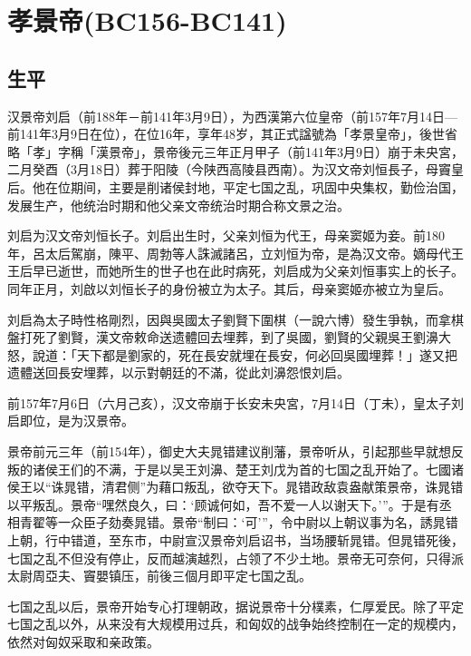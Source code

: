 
\section{孝景帝\tiny(BC156-BC141)}

\subsection{生平}

汉景帝刘启（前188年－前141年3月9日），为西漢第六位皇帝（前157年7月14日—前141年3月9日在位），在位16年，享年48岁，其正式諡號為「孝景皇帝」，後世省略「孝」字稱「漢景帝」，景帝後元三年正月甲子（前141年3月9日）崩于未央宮，二月癸酉（3月18日）葬于阳陵（今陕西高陵县西南）。为汉文帝刘恒長子，母竇皇后。他在位期间，主要是削诸侯封地，平定七国之乱，巩固中央集权，勤俭治国，发展生产，他统治时期和他父亲文帝统治时期合称文景之治。

刘启为汉文帝刘恒长子。刘启出生时，父亲刘恒为代王，母亲窦姬为妾。前180年，呂太后駕崩，陳平、周勃等人誅滅諸呂，立刘恒为帝，是為汉文帝。嫡母代王王后早已逝世，而她所生的世子也在此时病死，刘启成为父亲刘恒事实上的长子。同年正月，刘啟以刘恒长子的身份被立为太子。其后，母亲窦姬亦被立为皇后。

刘启為太子時性格剛烈，因與吳國太子劉賢下圍棋（一說六博）發生爭執，而拿棋盤打死了劉賢，漢文帝敕命送遗體回去埋葬，到了吳國，劉賢的父親吳王劉濞大怒，說道：「天下都是劉家的，死在長安就埋在長安，何必回吳國埋葬！」遂又把遗體送回長安埋葬，以示對朝廷的不滿，從此刘濞怨恨刘启。

前157年7月6日（六月己亥），汉文帝崩于长安未央宮，7月14日（丁未），皇太子刘启即位，是为汉景帝。

景帝前元三年（前154年），御史大夫晁错建议削藩，景帝听从，引起那些早就想反叛的诸侯王们的不满，于是以吴王刘濞、楚王刘戊为首的七国之乱开始了。七國诸侯王以“诛晁错，清君侧”为藉口叛乱，欲夺天下。晁错政敌袁盎献策景帝，诛晁错以平叛乱。景帝“嘿然良久，曰：‘顾诚何如，吾不爱一人以谢天下。’”。于是有丞相青翟等一众臣子劾奏晁错。景帝“制曰：‘可’”，令中尉以上朝议事为名，誘晁错上朝，行中错道，至东市，中尉宣汉景帝刘启诏书，当场腰斩晁错。但晁错死後，七国之乱不但没有停止，反而越演越烈，占领了不少土地。景帝无可奈何，只得派太尉周亞夫、竇嬰镇压，前後三個月即平定七国之乱。

七国之乱以后，景帝开始专心打理朝政，据说景帝十分樸素，仁厚爱民。除了平定七国之乱以外，从来没有大规模用过兵，和匈奴的战争始终控制在一定的规模内，依然对匈奴采取和亲政策。

